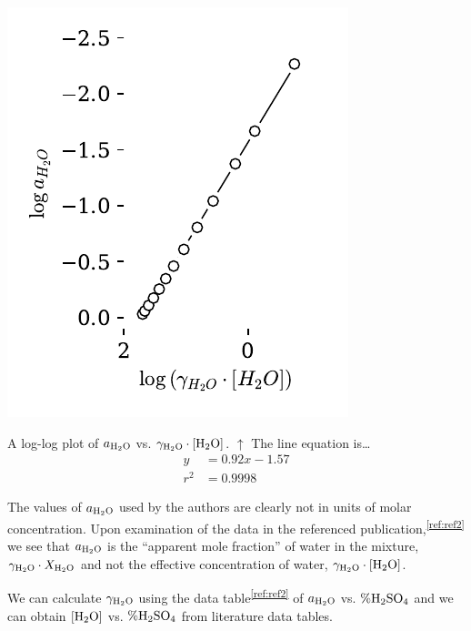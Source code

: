 \documentclass[]{tufte-handout}
\begin{document}
\begin{marginfigure}[-0mm]
  \centering
  \includegraphics[scale=0.7]{images/fig12}
  \caption{  \label{fig:fig12}
A log-log plot of $a_{\ce{H2O}}$ vs. $\gamma_{\ce{H2O}} \cdot [\ce{H2O}]$. $\uparrow$  The line equation is\ldots 
\begin{align*}
y &= 0.92x-1.57 \\  
r^2 &= 0.9998
\end{align*}} 
\end{marginfigure}

The values of $a_{\ce{H2O}}$ used by the authors are clearly not in units of molar concentration. Upon examination of the data in the referenced publication,\textsuperscript{\ref{ref:ref2}} we see that $a_{\ce{H2O}}$ is the ``apparent mole fraction'' of water in the mixture, $\gamma_{\ce{H2O}} \cdot X_{\ce{H2O}}$ and not the effective concentration of water, $\gamma_{\ce{H2O}} \cdot [\ce{H2O}]$. 


We can calculate $\gamma_{\ce{H2O}}$ using the data table\textsuperscript{\ref{ref:ref2}} of $a_{\ce{H2O}}$ vs. $\%\ce{H2SO4}$ and we can obtain $[\ce{H2O}]$ vs. $\%\ce{H2SO4}$ from literature data tables.
\end{document}
